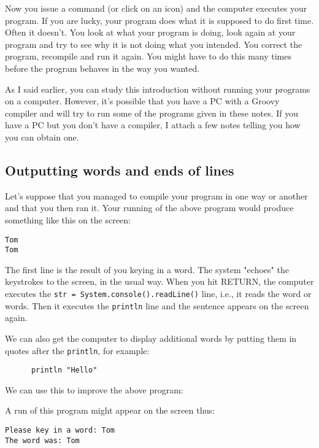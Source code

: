 Now you issue a command (or click on an icon) and the computer executes
your program.  If you are lucky, your program does what it is supposed
to do first time.  Often it doesn't.  You look at what your program is
doing, look again at your program and try to see why it is not doing what
you intended.  You correct the program, recompile and run it again.
You might have to do this many times before the program behaves in the way
you wanted.

As I said earlier, you can study this introduction without running your
programs on a computer.  However, it's possible that you have a PC with
a Groovy compiler and will try to run some of the programs given in these
notes. 
If you have a PC but you don't have a compiler, I attach a few notes telling
you how you can obtain one.

\subsection{Outputting words and ends of lines}

Let's suppose that you managed to compile your program in one way or
another and that you then ran it.  Your running of the above program
would produce something like this on the screen:

\begin{Verbatim}
Tom
Tom
\end{Verbatim}

The first line is the result of you keying in a word.  The system "echoes"
the keystrokes to the screen, in the usual way.  When you hit RETURN, the
computer executes the \verb!str = System.console().readLine()! line, 
i.e., it reads the word or words.  Then it
executes the \verb!println! line and the sentence appears on the screen again.

We can also get the computer to display additional words by putting
them in quotes after the \verb!println!, for example:

\begin{Verbatim}
      println "Hello"
\end{Verbatim}

We can use this to improve the above program:


A run of this program might appear on the screen thus:
\begin{Verbatim}
Please key in a word: Tom
The word was: Tom
\end{Verbatim}

